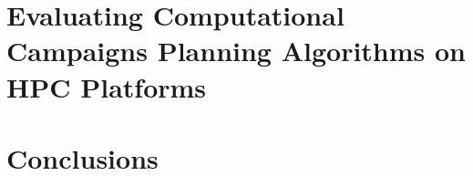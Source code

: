 \documentclass[final]{ruthesis}
\begin{document}
\chapter{Evaluating Computational Campaigns Planning Algorithms on HPC Platforms}
\label{ch:campaigns}


\chapter{Conclusions}

\label{ch:conclusions}



\end{document}
